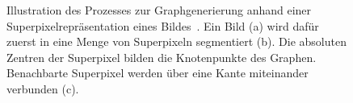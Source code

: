\begin{figure}[t]
\centering
{}
\caption[Graphgenerierung aus einer Superpixelrepräsentation]{Illustration des Prozesses zur Graphgenerierung anhand einer Superpixelrepräsentation eines Bildes~\cite{pascal_voc}.
Ein Bild (a) wird dafür zuerst in eine Menge von Superpixeln segmentiert (b).
Die absoluten Zentren der Superpixel bilden die Knotenpunkte des Graphen.
  Benachbarte Superpixel werden über eine Kante miteinander verbunden (c).}
\label{fig:superpixel_graph}
\end{figure}

